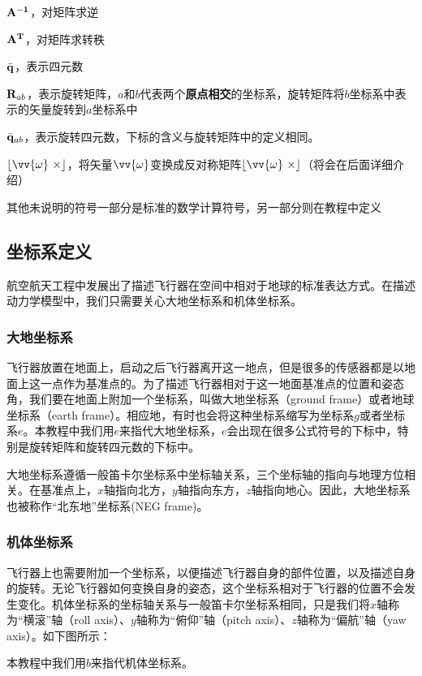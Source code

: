 \documentclass[11pt]{article}
\begin{document}
$\bf{A}^{-1}$，对矩阵求逆

$\bf{A}^T$，对矩阵求转秩

$\bar{\bf{q}}$，表示四元数

${\bf R}_{ab}$，表示旋转矩阵，$a$和$b$代表两个\textbf{原点相交}的坐标系，旋转矩阵将$b$坐标系中表示的矢量旋转到$a$坐标系中

$\bar{\bf{q}}_{ab}$，表示旋转四元数，下标的含义与旋转矩阵中的定义相同。

$\lfloor \vv{\omega} \ \times \rfloor$，将矢量$\vv{\omega}$变换成反对称矩阵$\lfloor \vv{\omega} \ \times \rfloor$（将会在后面详细介绍）

其他未说明的符号一部分是标准的数学计算符号，另一部分则在教程中定义
\subsection{坐标系定义}
航空航天工程中发展出了描述飞行器在空间中相对于地球的标准表达方式。在描述动力学模型中，我们只需要关心大地坐标系和机体坐标系。
\subsubsection{大地坐标系}
飞行器放置在地面上，启动之后飞行器离开这一地点，但是很多的传感器都是以地面上这一点作为基准点的。为了描述飞行器相对于这一地面基准点的位置和姿态角，我们要在地面上附加一个坐标系，叫做大地坐标系（ground frame）或者地球坐标系（earth frame）。相应地，有时也会将这种坐标系缩写为坐标系$g$或者坐标系$e$。本教程中我们用$e$来指代大地坐标系，$e$会出现在很多公式符号的下标中，特别是旋转矩阵和旋转四元数的下标中。

大地坐标系遵循一般笛卡尔坐标系中坐标轴关系，三个坐标轴的指向与地理方位相关。在基准点上，$x$轴指向北方，$y$轴指向东方，$z$轴指向地心。因此，大地坐标系也被称作“北东地”坐标系(NEG frame)。
\subsubsection{机体坐标系}\label{sec:bodyframe}
飞行器上也需要附加一个坐标系，以便描述飞行器自身的部件位置，以及描述自身的旋转。无论飞行器如何变换自身的姿态，这个坐标系相对于飞行器的位置不会发生变化。机体坐标系的坐标轴关系与一般笛卡尔坐标系相同，只是我们将$x$轴称为“横滚”轴（roll axis）、$y$轴称为“俯仰”轴（pitch axis）、$z$轴称为“偏航”轴（yaw axis）。如下图所示：

本教程中我们用$b$来指代机体坐标系。
\end{document}
